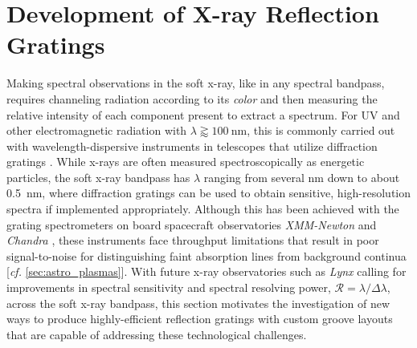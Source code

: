 \section{Development of X-ray Reflection Gratings}\label{sec:grating_tech_dev}
Making spectral observations in the soft x-ray, like in any spectral bandpass, requires channeling radiation according to its \emph{color} and then measuring the relative intensity of each component present to extract a spectrum. 
For UV and other electromagnetic radiation with $\lambda \gtrapprox \SI{100}{\nm}$, this is commonly carried out with wavelength-dispersive instruments in telescopes that utilize diffraction gratings \cite{Loewen97,Ryden10}. 
While x-rays are often measured spectroscopically as energetic particles, the soft x-ray bandpass has $\lambda$ ranging from several \si{\nm} down to about \SI{0.5}{\nm}, where diffraction gratings can be used to obtain sensitive, high-resolution spectra if implemented appropriately. 
Although this has been achieved with the grating spectrometers on board spacecraft observatories \emph{XMM-Newton} \cite{Jansen01,denHerder01,Lumb12} and \emph{Chandra} \cite{Canizares00,Weisskopf00}, these instruments face throughput limitations that result in poor signal-to-noise for distinguishing faint absorption lines from background continua [\emph{cf.\@} \cref{sec:astro_plasmas}]. 
With future x-ray observatories such as \emph{Lynx} \cite{Gaskin19,Lynx_web} calling for improvements in spectral sensitivity and spectral resolving power, $\mathscr{R} = \lambda / \Delta \lambda$, across the soft x-ray bandpass, this section motivates the investigation of new ways to produce highly-efficient reflection gratings with custom groove layouts that are capable of addressing these technological challenges. 

